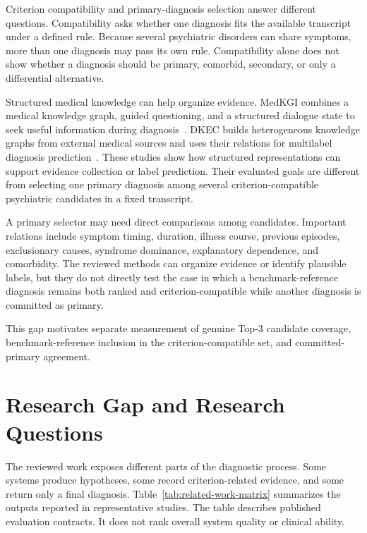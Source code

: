 Criterion compatibility and primary-diagnosis selection answer different questions. Compatibility asks whether one diagnosis fits the available transcript under a defined rule. Because several psychiatric disorders can share symptoms, more than one diagnosis may pass its own rule. Compatibility alone does not show whether a diagnosis should be primary, comorbid, secondary, or only a differential alternative.

Structured medical knowledge can help organize evidence. MedKGI combines a medical knowledge graph, guided questioning, and a structured dialogue state to seek useful information during diagnosis~\citep{wang2025medkgi}. DKEC builds heterogeneous knowledge graphs from external medical sources and uses their relations for multilabel diagnosis prediction~\citep{ge2024dkec}. These studies show how structured representations can support evidence collection or label prediction. Their evaluated goals are different from selecting one primary diagnosis among several criterion-compatible psychiatric candidates in a fixed transcript.

A primary selector may need direct comparisons among candidates. Important relations include symptom timing, duration, illness course, previous episodes, exclusionary causes, syndrome dominance, explanatory dependence, and comorbidity. The reviewed methods can organize evidence or identify plausible labels, but they do not directly test the case in which a benchmark-reference diagnosis remains both ranked and criterion-compatible while another diagnosis is committed as primary.

This gap motivates separate measurement of genuine Top-3 candidate coverage, benchmark-reference inclusion in the criterion-compatible set, and committed-primary agreement.

\section{Research Gap and Research Questions}

The reviewed work exposes different parts of the diagnostic process. Some systems produce hypotheses, some record criterion-related evidence, and some return only a final diagnosis. Table~\ref{tab:related-work-matrix} summarizes the outputs reported in representative studies. The table describes published evaluation contracts. It does not rank overall system quality or clinical ability.


